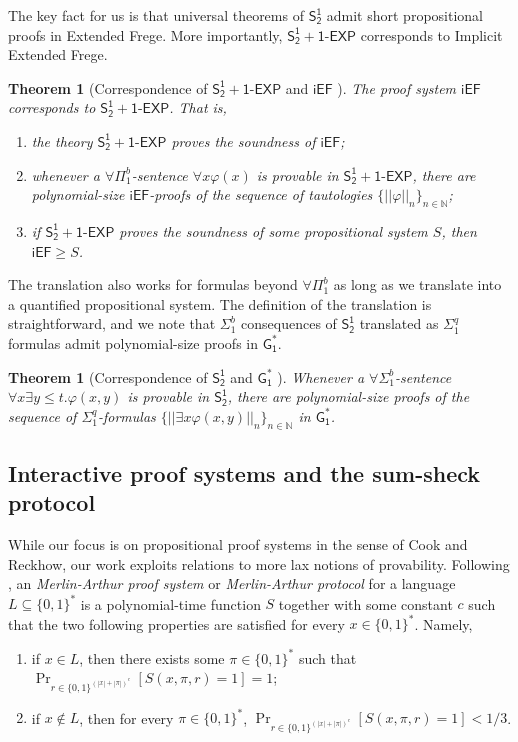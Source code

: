 \documentclass[11pt]{article}
\newcommand{\SOT}{\mathsf{S^1_2}}
\newcommand{\SOTEXP}{\mathsf{S^1_2} + \mathsf{1\textsf{-}EXP}}
\newcommand{\trans}[1]{||#1||}
\newcommand{\GOS}{\mathsf{G^*_1}}
\newcommand{\iEF}{\mathsf{iEF}}
\theoremstyle{definition}
\theoremstyle{plain}
\newtheorem{theorem}[definition]{Theorem}
\theoremstyle{remark}
\newcommand{\bbN}{\mathbb{N}}
\begin{document}
The key fact for us is that universal theorems of $\SOT$ admit short propositional proofs in Extended Frege. More importantly, $\SOTEXP$ corresponds to Implicit Extended Frege.

\begin{theorem}[Correspondence of $\SOTEXP$ and $\iEF$ {\cite[Thm. 2.1]{Kra04}}]
\label{thm:kra04-correspondence-iEF}
The proof system $\iEF$ corresponds to $\SOTEXP$. That is,
\begin{enumerate}[label=(\roman*)]
    \item the theory $\SOTEXP$ proves the soundness of $\iEF$;
    \item whenever a $\forall\Pi_1^b$-sentence $\forall x \varphi(x)$ is provable in $\SOTEXP$, there are polynomial-size $\iEF$-proofs of the sequence of tautologies $\{\trans{\varphi}_n\}_{n\in \bbN}$;
    \item if $\SOTEXP$ proves the soundness of some propositional system $S$, then $\iEF \geq S$.
\end{enumerate}
\end{theorem}

The translation also works for formulas beyond $\forall \Pi^{b}_1$ as long as we translate into a quantified propositional system. The definition of the translation is straightforward, and we note that $\Sigma^b_1$ consequences of $\SOT$ translated as $\Sigma_1^q$ formulas admit polynomial-size proofs in $\GOS$.

\begin{theorem}[Correspondence of $\SOT$ and $\GOS$ \cite{KP90}]
\label{thm:KP90-correspondence-S12-G1*}
Whenever a $\forall\Sigma_1^b$-sentence $\forall x \exists y \leq t. \varphi(x, y)$ is provable in $\SOT$, there are polynomial-size proofs of the sequence of $\Sigma^q_1$-formulas $\{\trans{\exists x \varphi(x, y)}_n\}_{n\in \bbN}$ in $\GOS$.
\end{theorem}

\subsection{Interactive proof systems and the sum-sheck protocol}
While our focus is on propositional proof systems in the sense of Cook and Reckhow, our work exploits relations to more lax notions of provability. Following \citeauthor{Bab85} \cite{Bab85}, an \emph{Merlin-Arthur proof system} or \emph{Merlin-Arthur protocol} for a language $L \subseteq \{ 0,1\}^*$ is a polynomial-time function $S$ together with some constant $c$ such that the two following properties are satisfied for every $x \in \{ 0,1\}^*$. Namely,
\begin{enumerate}
    \item if $x \in L$, then there exists some $\pi \in \{ 0,1\}^*$ such that $\Pr_{r \in \{ 0,1\}^{(|x| + |\pi|)^c}} [S(x, \pi, r) = 1] = 1$;
    \item if $x\not\in L$, then for every $\pi \in \{0,1\}^*$, $\Pr_{r \in \{ 0,1\}^{(|x| + |\pi|)^{c}}} [S(x, \pi, r) = 1] < 1/3$.
\end{enumerate}
\end{document}
